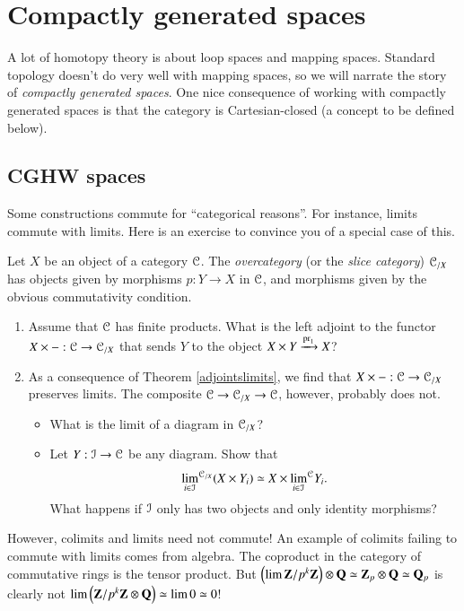 \section{Compactly generated spaces}
A lot of homotopy theory is about loop spaces and mapping spaces.
Standard topology doesn't do very well with mapping spaces, so we will narrate the story of \emph{compactly generated spaces}.
One nice consequence of working with compactly generated spaces is that the category is
Cartesian-closed (a concept to be defined below).

\subsection{CGHW spaces}
Some constructions commute for ``categorical reasons''.
For instance, limits commute with limits.
Here is an exercise to convince you of a special case of this.
\begin{exercise}%
    Let $X$ be an object of a category $\mathcal C$.
    The \emph{overcategory} (or the \emph{slice category}) $\mathcal C_{/X}$ has objects
    given by morphisms $p:Y\to X$ in $\mathcal C$, and morphisms given by the obvious
    commutativity condition.
    \begin{enumerate}
	\item Assume that $\mathcal C$ has finite products.
	    What is the left adjoint to the functor $X\times -:\mathcal C\to\mathcal C_{/X}$ that sends
	    $Y$ to the object $X\times Y \xrightarrow{{\mathrm{pr}_1}}X$?
	\item As a consequence of Theorem \ref{adjointslimits}, we find that $X\times -:\mathcal C\to\mathcal C_{/X}$ preserves limits.
	    The composite $\mathcal C\to\mathcal C_{/X}\to\mathcal C$, however, probably does not.
	    \begin{itemize}
		\item What is the limit of a diagram in $\mathcal C_{/X}$?
		\item Let $Y:\mathcal I\to\mathcal C$ be any diagram. Show that
		    $${\lim_{i\in\mathcal I}}^{\mathcal C_{/X}}(X\times Y_i)
		    \simeq X\times {\lim_{i\in\mathcal I}}^\mathcal C Y_i.$$
		    What happens if $\mathcal I$ only has two objects and only identity morphisms?
	    \end{itemize}
    \end{enumerate}
\end{exercise}
However, colimits and limits need not commute!
An example of colimits failing to commute with limits comes from algebra.
The coproduct in the category of commutative rings is the tensor product.
But $\left(\lim \mathbf Z/p^k\mathbf Z\right) \otimes \mathbf Q \simeq \mathbf Z_p \otimes \mathbf Q \simeq \mathbf Q_p$ is
clearly not $\lim\left(\mathbf Z/p^k\mathbf Z\otimes \mathbf Q\right) \simeq \lim 0 \simeq 0$!


